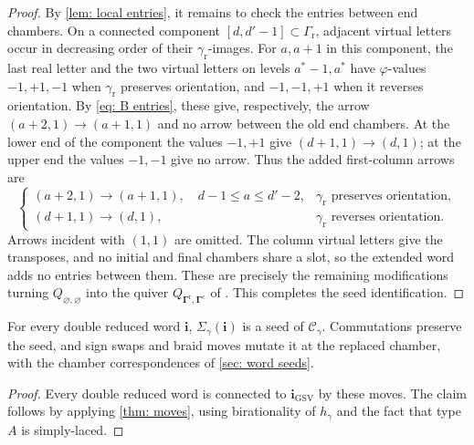 \documentclass[a4paper]{amsart}
\numberwithin{equation}{section}
\theoremstyle{definition}
\theoremstyle{remark}
\newcommand{\mcC}{\mathcal{C}}
\newcommand{\bfi}{\mathbf{i}}
\newcommand{\rr}{\mathrm{r}}
\newcommand{\cc}{\mathrm{c}}
\begin{document}
\begin{proof}
  By \cref{lem: local entries}, it remains to check the entries between end chambers.
  On a connected component $[d,d'-1]\subset\Gamma_{\rr}$, adjacent virtual letters occur in decreasing order of their $\gamma_{\rr}$-images.
  For $a,a+1$ in this component, the last real letter and the two virtual letters on levels $a^*-1,a^*$ have $\varphi$-values $-1,+1,-1$ when $\gamma_{\rr}$ preserves orientation, and $-1,-1,+1$ when it reverses orientation.
  By \eqref{eq: B entries}, these give, respectively, the arrow $(a+2,1)\to(a+1,1)$ and no arrow between the old end chambers.
  At the lower end of the component the values $-1,+1$ give $(d+1,1)\to(d,1)$; at the upper end the values $-1,-1$ give no arrow.
  Thus the added first-column arrows are
  \[
    \begin{cases}
      (a+2,1)\to(a+1,1),\quad d-1\le a\le d'-2,&\gamma_{\rr}\text{ preserves orientation},\\
      (d+1,1)\to(d,1),&\gamma_{\rr}\text{ reverses orientation}.
    \end{cases}
  \]
  Arrows incident with $(1,1)$ are omitted.
  The column virtual letters give the transposes, and no initial and final chambers share a slot, so the extended word adds no entries between them.
  These are precisely the remaining modifications turning $Q_{\varnothing,\varnothing}$ into the quiver $Q_{\mathbf\Gamma^\rr,\mathbf\Gamma^\cc}$ of \cite[Section~4.3]{GSV23}.
  This completes the seed identification.
\end{proof}

\begin{corollary}
  \label{cor: type A seeds}
  For every double reduced word $\bfi$, $\Sigma_\gamma(\bfi)$ is a seed of $\mcC_\gamma$.
  Commutations preserve the seed, and sign swaps and braid moves mutate it at the replaced chamber, with the chamber correspondences of \cref{sec: word seeds}.
\end{corollary}
\begin{proof}
  Every double reduced word is connected to $\bfi_\mathrm{GSV}$ by these moves.
  The claim follows by applying \cref{thm: moves}, using birationality of $h_\gamma$ and the fact that type $A$ is simply-laced.
\end{proof}
\end{document}
